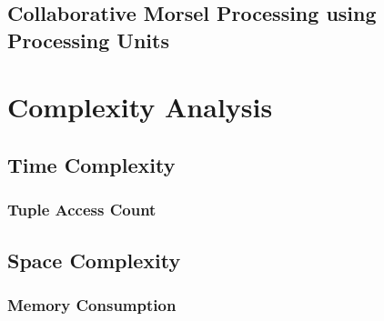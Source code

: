 \subsection{Collaborative Morsel Processing using Processing Units}


\section{Complexity Analysis}
\subsection{Time Complexity}
\subsubsection{Tuple Access Count}
\subsection{Space Complexity}
\subsubsection{Memory Consumption}
